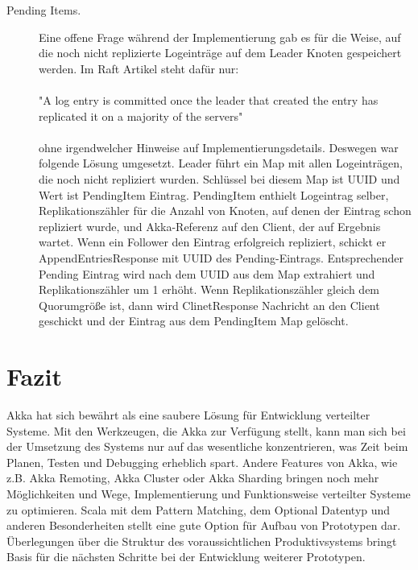 \begin{description}
	\item[Pending Items.] Eine offene Frage während der Implementierung gab es für die Weise, auf die noch nicht replizierte Logeinträge auf dem Leader Knoten gespeichert werden. Im Raft Artikel steht dafür nur:
	\\
	\\
	"A log entry is committed once the leader that created the entry has replicated it on a majority of the servers"
	\\
	\\
	ohne irgendwelcher Hinweise auf Implementierungsdetails. Deswegen war folgende Lösung umgesetzt. Leader führt ein Map mit allen Logeinträgen, die noch nicht repliziert wurden. Schlüssel bei diesem Map ist UUID und Wert ist PendingItem Eintrag. PendingItem enthielt Logeintrag selber, Replikationszähler für die Anzahl von Knoten, auf denen der Eintrag schon repliziert wurde, und Akka-Referenz auf den Client, der auf Ergebnis wartet. Wenn ein Follower den Eintrag erfolgreich repliziert, schickt er AppendEntriesResponse mit UUID des Pending-Eintrags. Entsprechender Pending Eintrag wird nach dem UUID aus dem Map extrahiert und Replikationszähler um 1 erhöht. Wenn Replikationszähler gleich dem Quorumgröße ist, dann wird ClinetResponse Nachricht an den Client geschickt und der Eintrag aus dem PendingItem Map gelöscht.
\end{description}

\section{Fazit}

Akka hat sich bewährt als eine saubere Lösung für Entwicklung verteilter Systeme. Mit den Werkzeugen, die Akka zur Verfügung stellt, kann man sich bei der Umsetzung des Systems nur auf das wesentliche konzentrieren, was Zeit beim Planen, Testen und Debugging erheblich spart. Andere Features von Akka, wie z.B. Akka Remoting, Akka Cluster oder Akka Sharding bringen noch mehr Möglichkeiten und Wege, Implementierung und Funktionsweise verteilter Systeme zu optimieren. Scala mit dem Pattern Matching, dem Optional Datentyp und anderen Besonderheiten stellt eine gute Option für Aufbau von Prototypen dar. Überlegungen über die Struktur des voraussichtlichen Produktivsystems bringt Basis für die nächsten Schritte bei der Entwicklung weiterer Prototypen.